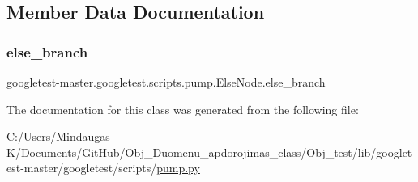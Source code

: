 \subsection{Member Data Documentation}
\mbox{\label{classgoogletest-master_1_1googletest_1_1scripts_1_1pump_1_1_else_node_a35b835947b95873f65ed6092718c0b43}} 
\subsubsection{\texorpdfstring{else\_branch}{else\_branch}}
{\footnotesize\ttfamily googletest-\/master.\+googletest.\+scripts.\+pump.\+Else\+Node.\+else\+\_\+branch}



The documentation for this class was generated from the following file\+:\begin{DoxyCompactItemize}
\item 
C\+:/\+Users/\+Mindaugas K/\+Documents/\+Git\+Hub/\+Obj\+\_\+\+Duomenu\+\_\+apdorojimas\+\_\+class/\+Obj\+\_\+test/lib/googletest-\/master/googletest/scripts/\mbox{\hyperlink{_obj__test_2lib_2googletest-master_2googletest_2scripts_2pump_8py}{pump.\+py}}\end{DoxyCompactItemize}

